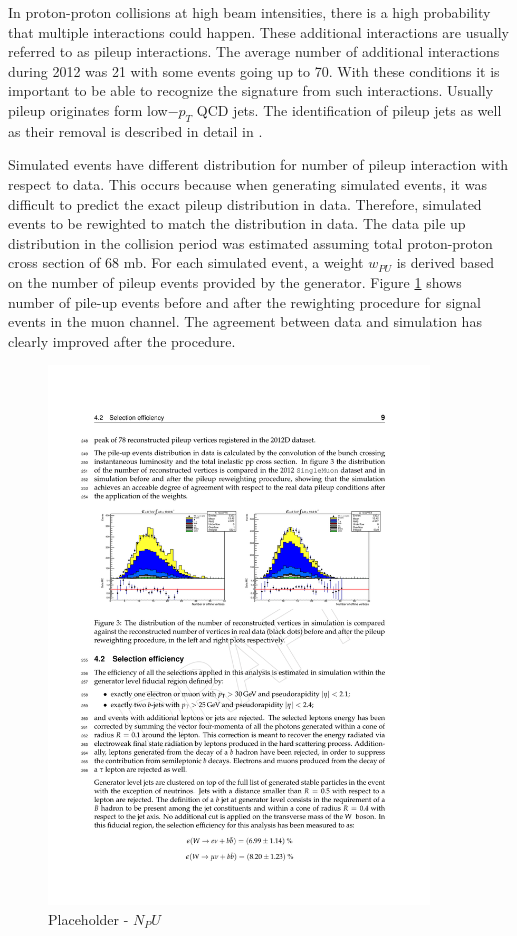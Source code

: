 In proton-proton collisions at high beam intensities, there is a high probability that multiple interactions could happen. These additional interactions are usually referred to as pileup interactions. The average number of additional interactions during 2012 was 21 with some events going up to 70. With these conditions it is important to be able to recognize the signature from such interactions. Usually pileup originates form low$-p_T$ QCD jets. The identification of pileup jets as well as their removal is described in detail in \cite{CMS:2013wea}. 
\par Simulated events have different distribution for number of pileup interaction with respect to data. This occurs because when generating simulated events, it was difficult to predict the exact pileup distribution in data. Therefore, simulated events to be rewighted to match the distribution in data. The data pile up distribution in the collision period was estimated assuming total proton-proton cross section of 68 mb. For each simulated event, a weight $w_{PU}$ is derived based on the number of pileup events provided by the generator. Figure \ref{fig:N_pu} shows number of pile-up events before and after the rewighting procedure for signal events in the muon channel. The agreement between data and simulation has clearly improved after the procedure. 

\begin{figure}[htbp]
	\centering
		\includegraphics[width=0.9\textwidth]{Figures/NPU_placeholder.pdf}
	\caption[Placeholder - PU]{Placeholder - $N_PU$}
	\label{fig:N_pu}
\end{figure} 

